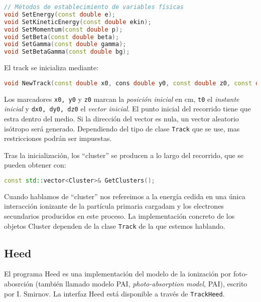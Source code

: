 \begin{lstlisting}[language=C++,style=c++]
// Métodos de establecimiento de variables físicas
void SetEnergy(const double e);
void SetKineticEnergy(const double ekin);
void SetMomentum(const double p);
void SetBeta(const double beta);
void SetGamma(const double gamma);
void SetBetaGamma(const double bg);
\end{lstlisting}
\vspace*{0.7em}
El track se inicializa mediante:   \\ 
\begin{lstlisting}[language=C++,style=c++]
void NewTrack(const double x0, cons double y0, const double z0, const double t0, const double dx0, const double dy0, const double dz0)
\end{lstlisting}
\vspace*{0.7em}
Los marcadores \texttt{x0, y0} y \texttt{z0} marcan la \textit{posición inicial} en cm, \texttt{t0} el \textit{instante inicial} y \texttt{dx0, dy0, dz0} el \textit{vector inicial}. El punto inicial del recorrido tiene que estra dentro del medio. Si la dirección del vector es nula, un vector aleatorio isótropo será generado. Dependiendo del tipo de clase \texttt{Track} que se use, mas restricciones podrán ser impuestas. 

Tras la inicialización, los ``cluster'' se producen a lo largo del recorrido, que se pueden obtener con: \\

\begin{lstlisting}[language=C++,style=c++]
const std::vector<Cluster>& GetClusters();
\end{lstlisting}
\vspace*{0.7em}
Cuando hablamos de ``cluster'' nos refereimos a la energía cedida en una única interacción ionizante de la partícula primaria cargadam y los electrones  secundarios producidos en este proceso. La implementación concreto de los objetos Cluster dependen de la clase \texttt{Track} de la que estemos hablando. 

\subsection{Heed}

El programa Heed es una implementación del modelo de la ionización por foto-abosrción (también llamado modelo PAI, \textit{photo-absorption model}, PAI), escrito por I. Smirnov. La interfaz Heed está disponible a través de \texttt{TrackHeed}.


